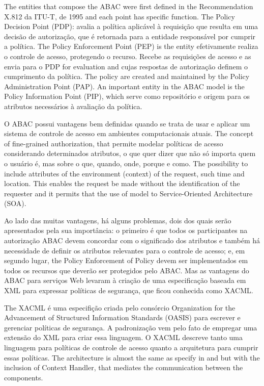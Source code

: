 \documentclass{doublecol-new}
\begin{document}
The entities that compose the ABAC were first defined in the Recommendation X.812 da ITU-T, de 1995 \citep{itut1996acframework} and each point has specific function. The Policy Decision Point (PDP): avalia a política aplicável à requisição que resulta em uma decisão de autorização, que é retornada para a entidade responsável por cumprir a política. The Policy Enforcement Point (PEP) is the entity efetivamente realiza o controle de acesso, protegendo o recurso. Recebe as requisições de acesso e as envia para o PDP for evaluation and cujas respostas de autorização definem o cumprimento da política. The policy are created and maintained by the Policy Administration Point (PAP). An important entity in the ABAC model is the Policy Information Point (PIP), which serve como repositório e origem para os atributos necessários à avaliação da política.

O ABAC possui vantagens bem definidas quando se trata de usar e aplicar um sistema de controle de acesso em ambientes computacionais atuais. The concept of fine-grained authorization, that permite modelar políticas de acesso considerando determinados atributos, o que quer dizer que não só importa quem o usuário é, mas sobre o que, quando, onde, porque e como. The possibility to include attributes of the environment (context) of the request, such time and location. This enables the request be made without the identification of the requester and it permits that the use of model to Service-Oriented Architecture (SOA).

Ao lado das muitas vantagens, há alguns problemas, dois dos quais serão apresentados pela sua importância: o primeiro é que todos os participantes na autorização ABAC devem concordar com o significado dos atributos \cite{karp2010abac} \cite{Rubio-Medrano2015federated} e também há necessidade de definir os atributos relevantes para o controle de acesso; e, em segundo lugar, the Policy Enforcement of Policy devem ser implementados em todos os recursos que deverão ser protegidos pelo ABAC. Mas as vantagens do ABAC para serviços Web levaram à criação de uma especificação baseada em XML para expressar políticas de segurança, que ficou conhecida como XACML.

The XACML é uma especifição criada pelo consórcio Organization for the Advancement of Structured Information Standards (OASIS) para escrever e gerenciar políticas de segurança. A padronização vem pelo fato de empregar uma extensão do XML para criar essa linguagem. O XACML descreve tanto uma linguagem para políticas de controle de acesso quanto a arquitetura para cumprir essas políticas. The architecture is almost the same as specify in \cite{huABAC2014guide} and \cite{itut1996acframework} but with the inclusion of Context Handler, that mediates the communication between the components.
\end{document}

